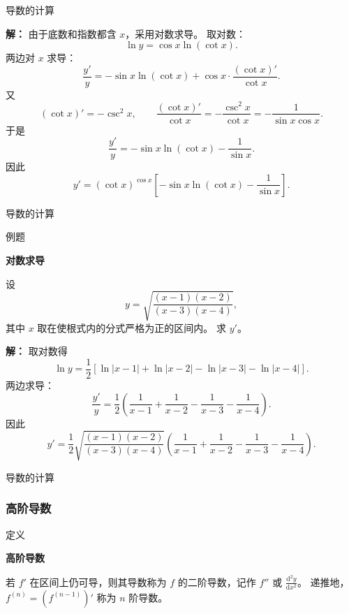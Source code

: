 \documentclass[aspectratio=169,10pt,fontset=fandol]{ctexbeamer}
\newcommand{\dd}{\mathrm{d}}
\begin{document}
\begin{frame}[t,fragile]{导数的计算}
\footnotesize
{\footnotesize
\textbf{解：}
由于底数和指数都含 $x$，采用对数求导。 取对数：
	\[
	\ln y=\cos x\ln(\cot x).
	\]
	两边对 $x$ 求导：
	\[
	\frac{y'}{y}
	=-\sin x\ln(\cot x)+\cos x\cdot\frac{(\cot x)'}{\cot x}.
	\]
	又
	\[
	(\cot x)'=-\csc^2x,\qquad
	\frac{(\cot x)'}{\cot x}
	=-\frac{\csc^2x}{\cot x}
	=-\frac{1}{\sin x\cos x}.
	\]
	于是
	\[
	\frac{y'}{y}
	=-\sin x\ln(\cot x)-\frac1{\sin x}.
	\]
	因此
	\[
	y'=(\cot x)^{\cos x}\left[-\sin x\ln(\cot x)-\frac1{\sin x}\right].
	\]

}
\end{frame}
\begin{frame}[t,fragile]{导数的计算}
\small
\begin{block}{例题}
{\small
\textbf{对数求导}\par

	设
	\[
	y=\sqrt{\frac{(x-1)(x-2)}{(x-3)(x-4)}},
	\]
	其中 $x$ 取在使根式内的分式严格为正的区间内。 求 $y'$。

}
\end{block}
\pause
{\small
\textbf{解：}
取对数得
	\[
	\ln y=\frac12\left[\ln|x-1|+\ln|x-2|-\ln|x-3|-\ln|x-4|\right].
	\]
	两边求导：
	\[
	\frac{y'}{y}
	=\frac12\left(\frac1{x-1}+\frac1{x-2}-\frac1{x-3}-\frac1{x-4}\right).
	\]
	因此
	\[
	y'=\frac12\sqrt{\frac{(x-1)(x-2)}{(x-3)(x-4)}}
	\left(\frac1{x-1}+\frac1{x-2}-\frac1{x-3}-\frac1{x-4}\right).
	\]

}
\end{frame}
\begin{frame}[t,fragile]{导数的计算}
\normalsize
{\normalsize

\subsubsection*{高阶导数}


}
\begin{block}{定义}
{\normalsize
\textbf{高阶导数}\par

若 $f'$ 在区间上仍可导，则其导数称为 $f$ 的二阶导数，记作 $f''$ 或 $\frac{\dd^2y}{\dd x^2}$。 递推地，$f^{(n)}=(f^{(n-1)})'$ 称为 $n$ 阶导数。

}
\end{block}
\end{frame}
\end{document}
